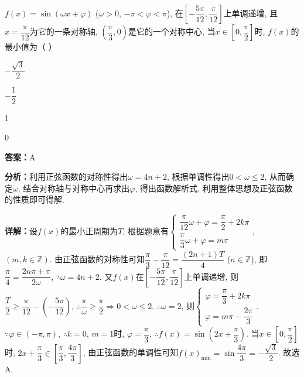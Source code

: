 \begin{question}[points=5]
$f(x) = \sin(\omega x + \varphi)$ ($\omega > 0$, $-\pi < \varphi < \pi$), 在$\left[-\dfrac{5\pi}{12}, \dfrac{\pi}{12}\right]$上单调递增, 且$x = \dfrac{\pi}{12}$为它的一条对称轴, $\left(\dfrac{\pi}{3}, 0\right)$是它的一个对称中心, 当$x \in \left[0, \dfrac{\pi}{2}\right]$时, $f(x)$的最小值为（   ）
\begin{choices}
  \item $-\dfrac{\sqrt{3}}{2}$
  \item $-\dfrac{1}{2}$
  \item 1
  \item 0
\end{choices}
\begin{solution}
\textbf{答案：}A

\textbf{分析：}利用正弦函数的对称性得出$\omega = 4n + 2$, 根据单调性得出$0 < \omega \le 2$, 从而确定$\omega$, 结合对称轴与对称中心再求出$\varphi$, 得出函数解析式, 利用整体思想及正弦函数的性质即可得解.

\textbf{详解：}设$f(x)$的最小正周期为$T$, 根据题意有$\begin{cases} \dfrac{\pi}{12}\omega + \varphi = \dfrac{\pi}{2} + 2k\pi \\ \dfrac{\pi}{3}\omega + \varphi = m\pi \end{cases}$, $(m, k \in \mathbb{Z})$. 由正弦函数的对称性可知$\dfrac{\pi}{3} - \dfrac{\pi}{12} = \dfrac{(2n+1)T}{4}$ ($n \in \mathbb{Z}$), 即$\dfrac{\pi}{4} = \dfrac{2n\pi + \pi}{2\omega}$, $\therefore \omega = 4n + 2$. 又$f(x)$在$\left[-\dfrac{5\pi}{12}, \dfrac{\pi}{12}\right]$上单调递增, 则$\dfrac{T}{2} \ge \dfrac{\pi}{12} - \left(-\dfrac{5\pi}{12}\right)$, $\therefore \dfrac{\pi}{\omega} \ge \dfrac{\pi}{2} \Rightarrow 0 < \omega \le 2$. $\therefore \omega = 2$, 则$\begin{cases} \varphi = \dfrac{\pi}{3} + 2k\pi \\ \varphi = m\pi - \dfrac{2\pi}{3} \end{cases}$. $\because \varphi \in (-\pi, \pi)$, $\therefore k=0$, $m=1$时, $\varphi = \dfrac{\pi}{3}$, $\therefore f(x) = \sin\left(2x + \dfrac{\pi}{3}\right)$. 当$x \in \left[0, \dfrac{\pi}{2}\right]$时, $2x + \dfrac{\pi}{3} \in \left[\dfrac{\pi}{3}, \dfrac{4\pi}{3}\right]$, 由正弦函数的单调性可知$f(x)_{\min} = \sin\dfrac{4\pi}{3} = -\dfrac{\sqrt{3}}{2}$. 故选A.
\end{solution}
\end{question}

